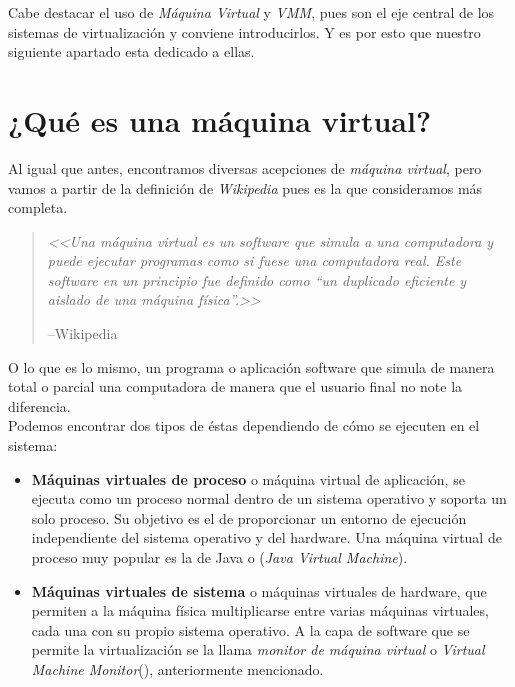 \noindent Cabe destacar el uso de  \emph{Máquina Virtual} y \emph{VMM}, pues son el eje central de los sistemas de virtualización y conviene introducirlos. Y es por esto que nuestro siguiente apartado esta dedicado a ellas.

\section{¿Qué es una máquina virtual?}

\noindent Al igual que antes, encontramos diversas acepciones de \emph{máquina virtual}, pero vamos a partir de la definición de \emph{Wikipedia} pues es la que consideramos más completa.

\begin{quote}
\emph{<<Una máquina virtual es un software que simula a una computadora y puede ejecutar programas como si fuese una computadora real. Este software en un principio fue definido como \textquotedblleft un duplicado eficiente y aislado de una máquina física\textquotedblright.>>}
\begin{flushright}
--Wikipedia\cite{defmaqvirwiki}
\end{flushright}
\end{quote}

\noindent O lo que es lo mismo, un programa o aplicación software que simula de manera total o parcial una computadora de manera que el usuario final no note la diferencia.\\

\noindent Podemos encontrar dos tipos de éstas dependiendo de cómo se ejecuten en el sistema:

\begin{itemize}
\item \textbf{Máquinas virtuales de proceso} o máquina virtual de aplicación, se ejecuta como un proceso normal dentro de un sistema operativo y soporta un solo proceso. Su objetivo es el de proporcionar un entorno de ejecución independiente del sistema operativo y del hardware. Una máquina virtual de proceso muy popular es la de Java o  (\emph{Java Virtual Machine}).
\item \textbf{Máquinas virtuales de sistema} o máquinas virtuales de hardware, que permiten a la máquina física multiplicarse entre varias máquinas virtuales, cada una con su propio sistema operativo. A la capa de software que se permite la virtualización se la llama \emph{monitor de máquina virtual} o \emph{Virtual Machine Monitor}(), anteriormente mencionado.
\end{itemize}

